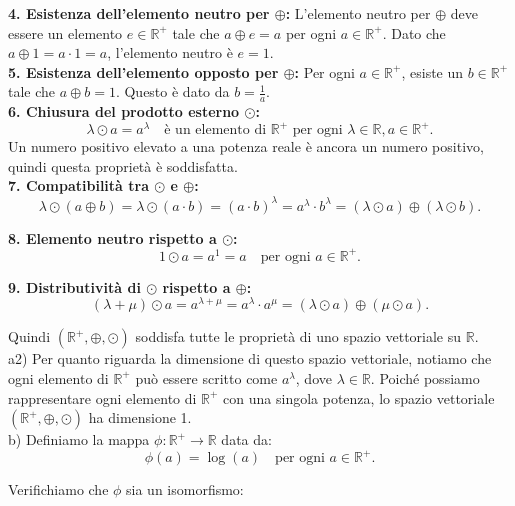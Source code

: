 	\textbf{4. Esistenza dell'elemento neutro per \(\oplus\):}
	L'elemento neutro per \(\oplus\) deve essere un elemento \(e \in \mathbb{R}^+\) tale che \(a \oplus e = a\) per ogni \(a \in \mathbb{R}^+\). Dato che \(a \oplus 1 = a \cdot 1 = a\), l'elemento neutro è \(e = 1\). \\
	
\textbf{	5. Esistenza dell'elemento opposto per \(\oplus\):}
	Per ogni \(a \in \mathbb{R}^+\), esiste un \(b \in \mathbb{R}^+\) tale che \(a \oplus b = 1\). Questo è dato da \(b = \frac{1}{a}\). \\
	
	\textbf{6. Chiusura del prodotto esterno \(\odot\):}
	\[
	\lambda \odot a = a^\lambda \quad \text{è un elemento di } \mathbb{R}^+ \text{ per ogni } \lambda \in \mathbb{R}, a \in \mathbb{R}^+.
	\]
	Un numero positivo elevato a una potenza reale è ancora un numero positivo, quindi questa proprietà è soddisfatta. \\
	
\textbf{	7. Compatibilità tra \(\odot\) e \(\oplus\):}
	\[
	\lambda \odot (a \oplus b) = \lambda \odot (a \cdot b) = (a \cdot b)^\lambda = a^\lambda \cdot b^\lambda = (\lambda \odot a) \oplus (\lambda \odot b).
	\]
	
\textbf{	8. Elemento neutro rispetto a \(\odot\):}
	\[
	1 \odot a = a^1 = a \quad \text{per ogni } a \in \mathbb{R}^+.
	\]
	
\textbf{	9. Distributività di \(\odot\) rispetto a \(\oplus\):}
	\[
	(\lambda + \mu) \odot a = a^{\lambda + \mu} = a^\lambda \cdot a^\mu = (\lambda \odot a) \oplus (\mu \odot a).
	\]
	
	Quindi \((\mathbb{R}^+, \oplus, \odot)\) soddisfa tutte le proprietà di uno spazio vettoriale su \(\mathbb{R}\). \\
	 
	a2) Per quanto riguarda la dimensione di questo spazio vettoriale, notiamo che ogni elemento di \(\mathbb{R}^+\) può essere scritto come \(a^\lambda\), dove \(\lambda \in \mathbb{R}\). Poiché possiamo rappresentare ogni elemento di \(\mathbb{R}^+\) con una singola potenza, lo spazio vettoriale \((\mathbb{R}^+, \oplus, \odot)\) ha dimensione 1. \\
	
	
	
	b) Definiamo la mappa \(\phi: \mathbb{R}^+ \to \mathbb{R}\) data da:
	\[
	\phi(a) = \log(a) \quad \text{per ogni } a \in \mathbb{R}^+.
	\]
	
	Verifichiamo che \(\phi\) sia un isomorfismo:
	
